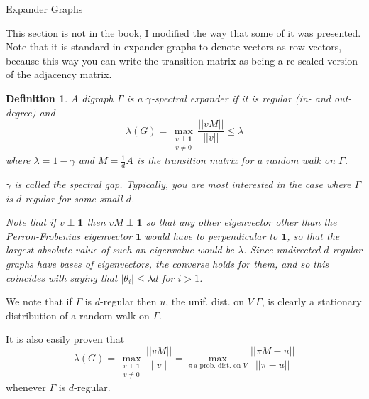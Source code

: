 \documentclass{article}
\newtheorem{defn}{Definition}
\begin{document}
\begin{section}{Expander Graphs}

  This section is not in the book, I modified the way that some of it was presented.
  Note that it is standard in expander graphs to denote vectors as row vectors, because this way you can write the transition matrix as being a re-scaled version of the adjacency matrix.

  \begin{defn}
    A digraph $\Gamma$ is a $\gamma$-spectral expander if it is regular (in- and out-degree) and
    $$
    \lambda(G) = \max_{\substack{v\perp \mathbf{1} \\ v \neq 0}}{\frac{||vM||}{||v||}} \leq \lambda 
    $$
    where $\lambda = 1-\gamma$ and $M = \frac{1}{d}A$ is the transition matrix for a random walk on $\Gamma$.
    
    $\gamma$ is called the spectral gap.
    Typically, you are most interested in the case where $\Gamma$ is $d$-regular for some small $d$.

    Note that if $v \perp \mathbf{1}$ then $vM \perp \mathbf{1}$ so that any other eigenvector other than the Perron-Frobenius eigenvector $\mathbf{1}$
    would have to perpendicular to $\mathbf{1}$, so that the largest absolute value of such an eigenvalue would be $\lambda$.
    Since undirected $d$-regular graphs have bases of eigenvectors, the converse holds for them, and so this coincides with saying that $|\theta_i| \leq \lambda d$ for $i > 1$.
  \end{defn}


  We note that if $\Gamma$ is $d$-regular then $u$, the unif. dist. on $V~\Gamma$, is clearly a stationary distribution of a random walk on $\Gamma$.

  It is also easily proven that
  $$
  \lambda(G) = \max_{\substack{v\perp \mathbf{1} \\ v \neq 0}}{\frac{||vM||}{||v||}} = \max_{\pi~\text{a prob. dist. on $V$}}{\frac{||\pi M - u||}{||\pi - u||}}
  $$
  whenever $\Gamma$ is $d$-regular.


\end{section}
\end{document}

